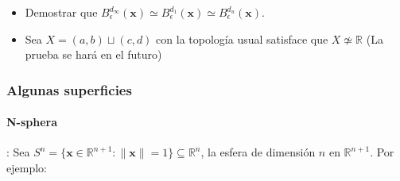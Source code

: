 \begin{itemize}
    \noindent\textbf{Interpretación geométrica y relación con el homeomorfismo radial:}
    
    El diagrama ilustra cómo cada punto $v$ de la bola abierta $B_{\varepsilon}(x)$ puede describirse por su dirección $\omega\in S^{n-1}$ (ángulo $\theta$ en el dibujo) y su distancia radial $r=\|v-x\|<\varepsilon$. 
    \begin{itemize}
      \item La curva en rojo marca el ángulo entre el vector radial $xv$ y el eje horizontal, representando la preservación de la dirección en el homeomorfismo.
      \item El homeomorfismo se define por 
        \[
          \Phi(v)=\frac{v-x}{\varepsilon-\|v-x\|}\in\mathbb{R}^n,
        \]
        de modo que mientras $r\to\varepsilon^{-}$, la imagen $\|\Phi(v)\|\to\infty$, rellenando todo $\mathbb{R}^n$.
      \item El sistema de ejes a la derecha simboliza $\mathbb{R}^n$, al que se envía el punto radial estirado.
      \item Este estiramiento radial es continuo y bijectivo, y su inversa
        \[
          \Phi^{-1}(w)=x+\frac{\varepsilon\,w}{1+\|w\|}
        \]
        también lo es, demostrando que $B_{\varepsilon}(x)\simeq\mathbb{R}^n$.
    \end{itemize}
    \item Demostrar que $B_\epsilon^{d_\infty}(\mathbf x) \simeq B_\epsilon^{d_1}(\mathbf x) \simeq B_\epsilon^{d_u}(\mathbf x)$.
    \item Sea $X = (a,b) \sqcup (c,d)$ con la topología usual satisface que $X \not\simeq \mathbb R$ (La prueba se hará en el futuro)
\end{itemize}

\subsubsection{Algunas superficies} 

\paragraph{N-sphera}: Sea $S^n = \{\mathbf x \in \mathbb R^{n+1} : \|\mathbf x\| = 1\} \subseteq \mathbb R^n$, la esfera de dimensión $n$ en $\mathbb R^{n+1}$. Por ejemplo:

